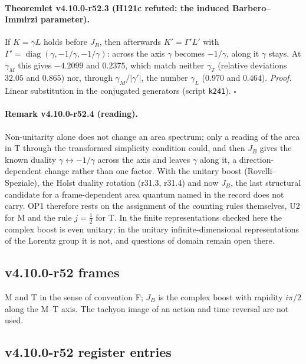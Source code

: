 \paragraph{Theoremlet v4.10.0-r52.3 (H121c refuted: the induced Barbero--Immirzi parameter).}
If \(K=\gamma L\) holds before \(J_B\), then afterwards \(K'=\Gamma'L'\) with \(\Gamma'=\operatorname{diag}(\gamma,-1/\gamma,-1/\gamma)\): across the axis \(\gamma\) becomes \(-1/\gamma\), along it \(\gamma\) stays.  At \(\gamma_M\) this
gives \(-4.2099\) and \(0.2375\), which match neither \(\gamma_T\) (relative deviations \(32.05\) and \(0.865\)) nor, through \(\gamma_M/|\gamma'|\), the number \(\gamma_L\) (\(0.970\) and \(0.464\)).
\emph{Proof.} Linear substitution in the conjugated generators (script \texttt{k241}).  \(\square\)

\paragraph{Remark v4.10.0-r52.4 (reading).}
Non-unitarity alone does not change an area spectrum; only a reading of the area in T through the transformed simplicity condition could, and then
\(J_B\) gives the known duality \(\gamma\leftrightarrow-1/\gamma\) across the axis and leaves \(\gamma\) along it, a direction-dependent change rather than one factor.  With the unitary boost
(Rovelli--Speziale), the Holst duality rotation (r31.3, r31.4) and now \(J_B\), the last structural candidate for a frame-dependent area quantum named in
the record does not carry.  OP1 therefore rests on the assignment of the counting rules themselves, U2 for M and the rule \(j=\tfrac12\) for T.  In the
finite representations checked here the complex boost is even unitary; in the unitary infinite-dimensional representations of the Lorentz group it
is not, and questions of domain remain open there.

\subsection*{v4.10.0-r52 frames}
\label{subsec:v4100-r52-frames}

M and T in the sense of convention F; \(J_B\) is the complex boost with rapidity \(i\pi/2\) along the M--T axis.  The tachyon image of an action and time reversal
are not used.

\subsection*{v4.10.0-r52 register entries}
\label{subsec:v4100-r52-register}

